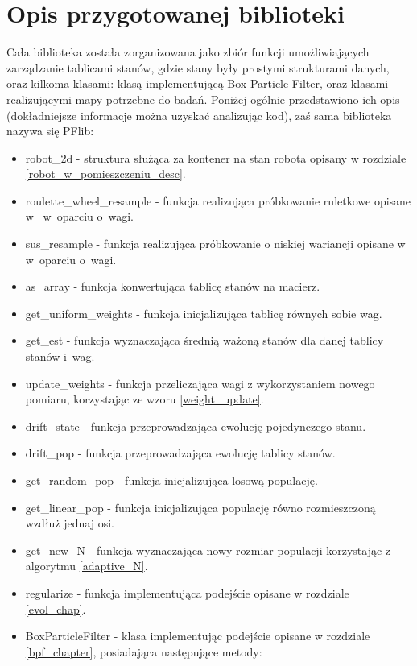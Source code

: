 \section{Opis przygotowanej biblioteki}
Cała biblioteka została zorganizowana jako zbiór funkcji umożliwiających zarządzanie tablicami stanów, gdzie stany były prostymi strukturami danych, oraz kilkoma klasami: klasą implementującą Box Particle Filter, oraz klasami realizującymi mapy potrzebne do badań. Poniżej ogólnie przedstawiono ich opis (dokładniejsze informacje można uzyskać analizując kod), zaś sama biblioteka nazywa się PFlib:
\begin{itemize}
	\item robot\_2d - struktura służąca za kontener na stan robota opisany w rozdziale \ref{robot_w_pomieszczeniu_desc}.
	\item roulette\_wheel\_resample - funkcja realizująca próbkowanie ruletkowe opisane w~\cite{rou_wiki} w~oparciu o~wagi.
	\item sus\_resample - funkcja realizująca próbkowanie o niskiej wariancji opisane w~\cite{sus_wiki} w~oparciu o~wagi.
	\item as\_array - funkcja konwertująca tablicę stanów na macierz.
	\item get\_uniform\_weights - funkcja inicjalizująca tablicę równych sobie wag.
	\item get\_est - funkcja wyznaczająca średnią ważoną stanów dla danej tablicy stanów i~wag.
	\item update\_weights - funkcja przeliczająca wagi z wykorzystaniem nowego pomiaru, korzystając ze wzoru \ref{weight_update}.
	\item drift\_state - funkcja przeprowadzająca ewolucję pojedynczego stanu.
	\item drift\_pop - funkcja przeprowadzająca ewolucję tablicy stanów.
	\item get\_random\_pop - funkcja inicjalizująca losową populację.
	\item get\_linear\_pop - funkcja inicjalizująca populację równo rozmieszczoną wzdłuż jednaj osi.
	\item get\_new\_N - funkcja wyznaczająca nowy rozmiar populacji korzystając z algorytmu \ref{adaptive_N}.
	\item regularize - funkcja implementująca podejście opisane w rozdziale \ref{evol_chap}.
	\item BoxParticleFilter - klasa implementując podejście opisane w rozdziale \ref{bpf_chapter}, posiadająca następujące metody:
	\begin{itemize}

\end{itemize}
\end{itemize}

